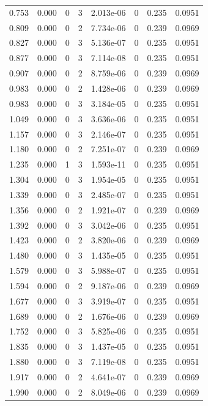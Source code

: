 \documentclass[preview]{standalone}
\begin{document}
{{\begin{tabular}{L{1.2cm}C{1.2cm} C{0.3cm}C{0.5cm} C{1.4cm}C{1.4cm} C{1.4cm}C{1.4cm}}
  0.753  &  0.000  & 0     &  3 &  2.013e-06  & 0  & 0.235 &  0.0951   \\ 
  0.809  &  0.000  & 0     &  2 &  7.734e-06  & 0  & 0.239 &  0.0969   \\ 
  0.827  &  0.000  & 0     &  3 &  5.136e-07  & 0  & 0.235 &  0.0951   \\ 
  0.877  &  0.000  & 0     &  3 &  7.114e-08  & 0  & 0.235 &  0.0951   \\ 
  0.907  &  0.000  & 0     &  2 &  8.759e-06  & 0  & 0.239 &  0.0969   \\ 
  0.983  &  0.000  & 0     &  2 &  1.428e-06  & 0  & 0.239 &  0.0969   \\ 
  0.983  &  0.000  & 0     &  3 &  3.184e-05  & 0  & 0.235 &  0.0951   \\ 
  1.049  &  0.000  & 0     &  3 &  3.636e-06  & 0  & 0.235 &  0.0951   \\ 
  1.157  &  0.000  & 0     &  3 &  2.146e-07  & 0  & 0.235 &  0.0951   \\ 
  1.180  &  0.000  & 0     &  2 &  7.251e-07  & 0  & 0.239 &  0.0969   \\ 
  1.235  &  0.000  & 1     &  3 &  1.593e-11  & 0  & 0.235 &  0.0951   \\ 
  1.304  &  0.000  & 0     &  3 &  1.954e-05  & 0  & 0.235 &  0.0951   \\ 
  1.339  &  0.000  & 0     &  3 &  2.485e-07  & 0  & 0.235 &  0.0951   \\ 
  1.356  &  0.000  & 0     &  2 &  1.921e-07  & 0  & 0.239 &  0.0969   \\ 
  1.392  &  0.000  & 0     &  3 &  3.042e-06  & 0  & 0.235 &  0.0951   \\ 
  1.423  &  0.000  & 0     &  2 &  3.820e-06  & 0  & 0.239 &  0.0969   \\ 
  1.480  &  0.000  & 0     &  3 &  1.435e-05  & 0  & 0.235 &  0.0951   \\ 
  1.579  &  0.000  & 0     &  3 &  5.988e-07  & 0  & 0.235 &  0.0951   \\ 
  1.594  &  0.000  & 0     &  2 &  9.187e-06  & 0  & 0.239 &  0.0969   \\ 
  1.677  &  0.000  & 0     &  3 &  3.919e-07  & 0  & 0.235 &  0.0951   \\ 
  1.689  &  0.000  & 0     &  2 &  1.676e-06  & 0  & 0.239 &  0.0969   \\ 
  1.752  &  0.000  & 0     &  3 &  5.825e-06  & 0  & 0.235 &  0.0951   \\ 
  1.835  &  0.000  & 0     &  3 &  1.437e-05  & 0  & 0.235 &  0.0951   \\ 
  1.880  &  0.000  & 0     &  3 &  7.119e-08  & 0  & 0.235 &  0.0951   \\ 
  1.917  &  0.000  & 0     &  2 &  4.641e-07  & 0  & 0.239 &  0.0969   \\ 
  1.990  &  0.000  & 0     &  2 &  8.049e-06  & 0  & 0.239 &  0.0969   \\ 
\hline 
\end{tabular} 

}}
\end{document}
